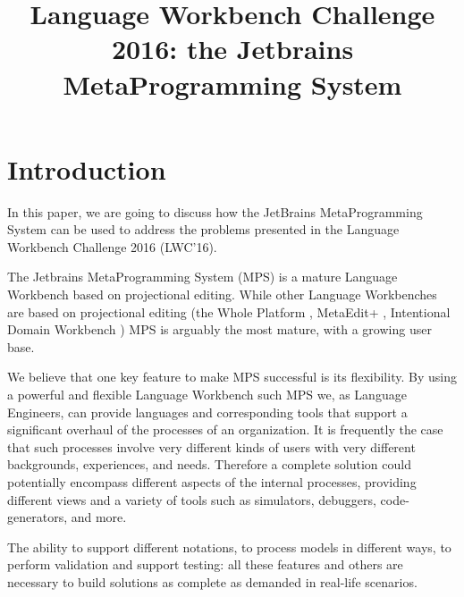 \documentclass[preprint,numbers,10pt]{sigplanconf}
\begin{document}
\title{Language Workbench Challenge 2016: the Jetbrains MetaProgramming System}


\maketitle

%
%

\section{Introduction}

In this paper, we are going to discuss how the JetBrains MetaProgramming System can be used to address the problems presented in the Language Workbench Challenge 2016 (LWC'16).

The Jetbrains MetaProgramming System (MPS) is a mature Language Workbench based on projectional editing. While other Language Workbenches are based on projectional editing (the Whole Platform \cite{solmi2005whole}, MetaEdit+ \cite{Tolvanen2006}, Intentional Domain Workbench \cite{Simonyi2006}) MPS is arguably the most mature, with a growing user base.

We believe that one key feature to make MPS successful is its flexibility. By using a powerful and flexible Language Workbench such MPS we, as Language Engineers, can provide languages and corresponding tools that support a significant overhaul of the processes of an organization. It is frequently the case that such processes involve very different kinds of users with very different backgrounds, experiences, and needs. Therefore a complete solution could potentially encompass different aspects of the internal processes, providing different views and a variety of tools such as simulators, debuggers, code-generators, and more.

The ability to support different notations, to process models in different ways, to perform validation and support testing: all these features and others are necessary to build solutions as complete as demanded in real-life scenarios.
\end{document}
